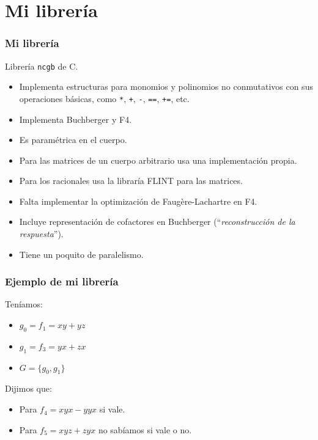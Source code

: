 \documentclass[spanish, aspectratio=169, hidecontrols]{beamer}
\newcommand\cpp{C\nolinebreak[4]\hspace{-.05em}\raisebox{.4ex}{\relsize{-3}{\textbf{++}}}\xspace}
\begin{document}
\section{Mi librería}

\begin{frame}
  \frametitle{Mi librería}
  Librería \texttt{ncgb} de \cpp.
  \pause
  \begin{itemize}
    \item Implementa estructuras para monomios y polinomios no conmutativos con sus operaciones básicas, como \texttt{*}, \texttt{+}, \texttt{-}, \texttt{==}, \texttt{+=}, etc.
    \pause
    \item Implementa Buchberger y F4.
    \pause
    \item Es \alert{paramétrica en el cuerpo}.
    \pause
    \item Para las matrices de un cuerpo arbitrario usa una implementación propia.
    \pause
    \item Para los racionales usa la libraría FLINT para las matrices. %
    \pause
    \item Falta implementar la optimización de Faugère-Lachartre en F4.
    \pause
    \item Incluye \alert{representación de cofactores} en Buchberger (``\textit{reconstrucción de la respuesta}'').
    \pause
    \item Tiene un poquito de paralelismo. %
  \end{itemize}
\end{frame}

\begin{frame}
  \frametitle{Ejemplo de mi librería}
  \begin{exampleblock}{}
    Teníamos:
    \begin{itemize}
      \item $g_0 = f_1 = xy + yz$
      \item $g_1 = f_3 = yx + zx$
      \item $G = \{g_0, g_1\}$
    \end{itemize}

    Dijimos que:
    \begin{itemize}
      \item Para $f_4 = xyx - yyx$ si vale.
      \item Para $f_5 = xyz + zyx$ no sabíamos si vale o no.
    \end{itemize}
  \end{exampleblock}
\end{frame}
\end{document}
